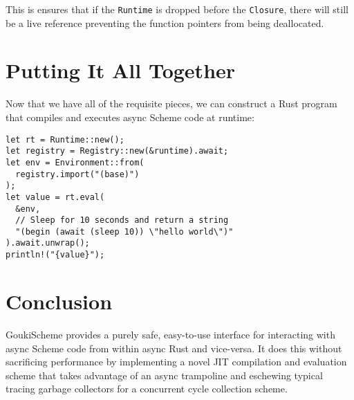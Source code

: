 \documentclass[sigplan,review,anonymous]{acmart}
\begin{document}
This is ensures that if the \texttt{Runtime} is dropped before the
\texttt{Closure}, there will still be a live reference preventing the function
pointers from being deallocated.

\section{Putting It All Together}

Now that we have all of the requisite pieces, we can construct a Rust program
that compiles and executes async Scheme code at runtime:

\begin{verbatim}
let rt = Runtime::new();
let registry = Registry::new(&runtime).await;
let env = Environment::from(
  registry.import("(base)")
);
let value = rt.eval(
  &env,
  // Sleep for 10 seconds and return a string
  "(begin (await (sleep 10)) \"hello world\")"
).await.unwrap();
println!("{value}");
\end{verbatim}

\section{Conclusion}

GoukiScheme provides a purely safe, easy-to-use interface for interacting with
async Scheme code from within async Rust and vice-versa. It does this without
sacrificing performance by implementing a novel JIT compilation and evaluation
scheme that takes advantage of an async trampoline and eschewing typical tracing
garbage collectors for a concurrent cycle collection scheme. 



\end{document}
